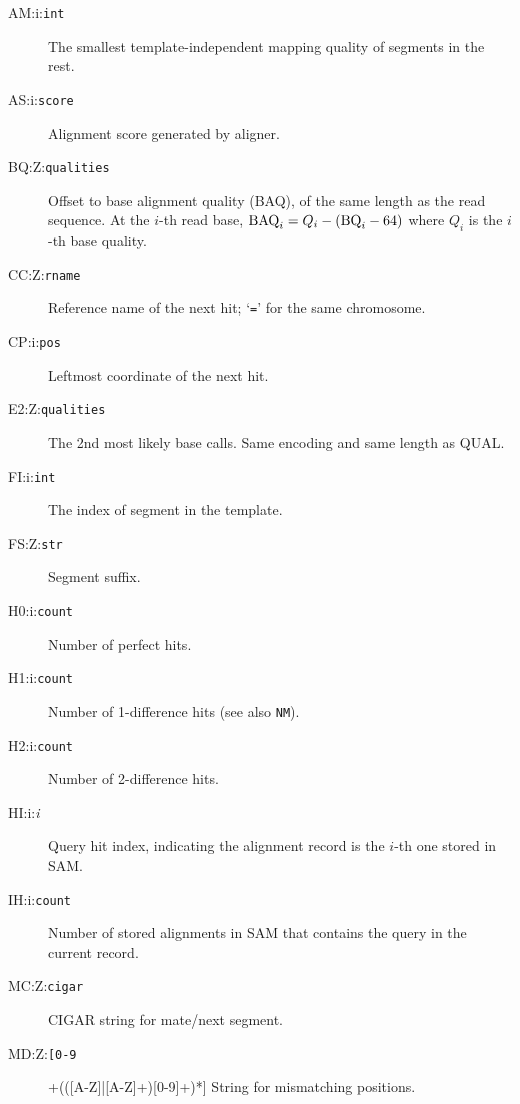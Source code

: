 \documentclass[10pt]{article}
\newcommand{\tagvalue}[1]{\tt #1}
\newcommand{\tagregex}[1]{\tt #1}
\begin{document}
\begin{description}
\item[AM:i:\tagvalue{int}]
The smallest template-independent mapping quality of segments in the rest.

\item[AS:i:\tagvalue{score}]
Alignment score generated by aligner.

\item[BQ:Z:\tagvalue{qualities}]
Offset to base alignment quality (BAQ), of the same length as the read sequence.
At the $i$-th read base, ${\rm BAQ}_i=Q_i-({\rm BQ}_i-64)$ where $Q_i$ is the $i$-th base quality.

\item[CC:Z:\tagvalue{rname}]
Reference name of the next hit; `{\tt =}' for the same chromosome.

\item[CP:i:\tagvalue{pos}]
Leftmost coordinate of the next hit.

\item[E2:Z:\tagvalue{qualities}]
The 2nd most likely base calls. Same encoding and same length as {\sf QUAL}.

\item[FI:i:\tagvalue{int}]
The index of segment in the template.

\item[FS:Z:\tagvalue{str}]
Segment suffix.

\item[H0:i:\tagvalue{count}]
Number of perfect hits.

\item[H1:i:\tagvalue{count}]
Number of 1-difference hits (see also {\tt NM}).

\item[H2:i:\tagvalue{count}]
Number of 2-difference hits.

\item[HI:i:\emph{i}]
Query hit index, indicating the alignment record is the $i$-th one stored
in SAM.

\item[IH:i:\tagvalue{count}]
Number of stored alignments in SAM that contains the query in the current
record.

\item[MC:Z:\tagvalue{cigar}]
CIGAR string for mate/next segment.

\item[MD:Z:\tagregex{[0-9]+(([A-Z]|[A-Z]+)[0-9]+)*}]
String for mismatching positions.


\end{description}
\end{document}
